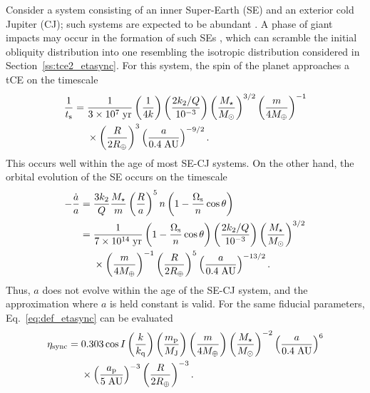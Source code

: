 \documentclass[
        fleqn,
        usenatbib,
        referee,
    ]{mnras}
\newcommand*{\p}[1]{\left(#1\right)}
\begin{document}
Consider a system consisting of an inner Super-Earth (SE) and an exterior cold
Jupiter (CJ); such systems are expected to be abundant \citep{zhu2018super}. A
phase of giant impacts may occur in the formation of such SEs
\citep{inamdar2015formation, izidoro2017breaking}, which can scramble the
initial obliquity distribution into one resembling the isotropic distribution
considered in Section~\ref{ss:tce2_etasync}. For this system, the spin of the
planet approaches a tCE on the timescale
\begin{align}
    \frac{1}{t_{\rm s}} ={}& \frac{1}{3 \times 10^7\;\mathrm{yr}}
            \p{\frac{1}{4k}}
            \p{\frac{2k_2/Q}{10^{-3}}}
            \p{\frac{M_\star}{M_{\odot}}}^{3/2}
            \p{\frac{m}{4M_{\oplus}}}^{-1}\nonumber\\
        &\times \p{\frac{R}{2R_{\oplus}}}^3
            \p{\frac{a}{0.4\;\mathrm{AU}}}^{-9/2}.
            \label{eq:sehj_ts}
\end{align}
This occurs well within the age of most SE-CJ systems. On the other hand,
the orbital evolution of the SE occurs on the timescale \citep{lai2012}
\begin{align}
    -\frac{\dot{a}}{a} ={}& \frac{3k_2}{Q}\frac{M_\star}{m}
            \p{\frac{R}{a}}^5n \p{1 - \frac{\Omega_{\rm s}}{n}\cos \theta}\nonumber\\
        ={}& \frac{1}{7 \times 10^{14}\;\mathrm{yr}}
            \p{1 - \frac{\Omega_{\rm s}}{n}\cos \theta}
            \p{\frac{2k_2/Q}{10^{-3}}}
            \p{\frac{M_\star}{M_{\odot}}}^{3/2}\nonumber\\
        &\times \p{\frac{m}{4M_{\oplus}}}^{-1}
            \p{\frac{R}{2R_{\oplus}}}^5
            \p{\frac{a}{0.4\;\mathrm{AU}}}^{-13/2}.\label{eq:sehj_adot}
\end{align}
Thus, $a$ does not evolve within the age of the SE-CJ system, and the
approximation where $a$ is held constant is valid. For the same fiducial
parameters, Eq.~\eqref{eq:def_etasync} can be evaluated
\begin{align}
    \eta_{\rm sync} ={}& 0.303 \cos I
            \p{\frac{k}{k_{\rm q}}}
            \p{\frac{m_{\rm p}}{M_{\rm J}}}
            \p{\frac{m}{4M_{\oplus}}}
            \p{\frac{M_\star}{M_{\odot}}}^{-2}
            \p{\frac{a}{0.4\;\mathrm{AU}}}^{6}\nonumber\\
        &\times \p{\frac{a_{\rm p}}{5\;\mathrm{AU}}}^{-3}
            \p{\frac{R}{2R_{\oplus}}}^{-3}.\label{eq:sehj_etasync}
\end{align}
\end{document}
